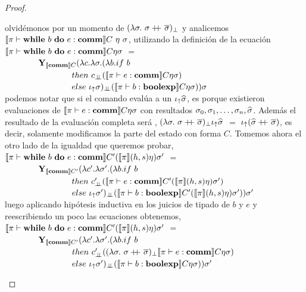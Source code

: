 \begin{proof}
\begin{itemize}
\begin{itemize}
olvid\'emonos por un momento de $(\lambda \sigma. \ \sigma +\kern-1.3ex+\kern0.8ex \overline{\sigma})_{\bot}$
y analicemos $\semBrcks{\pi \vdash \cwhiledo{b}{e} : \commt}C \ \eta \ \sigma$, utilizando
la definici\'on de la ecuaci\'on\\

$\llbracket \pi \vdash \textbf{while} \ b \ \textbf{do} \ e : \textbf{comm} \rrbracket C \eta \sigma$ $=$ \\
\indent \ \ \ \ \ \ \ \
$\textbf{Y}_{\llbracket \textbf{comm} \rrbracket C} (\lambda c . \lambda \sigma . (\lambda b . if \ b$ \\
\indent \ \ \ \ \ \ \ \ \ \ \ \ \ \ \ \
$then \ c_{\dbot}(\semBrcks{\pi \vdash e : \commt}C \eta \sigma)$ \\
\indent \ \ \ \ \ \ \ \ \ \ \ \ \ \ \ \
$else \ \iota_{\uparrow} \sigma)_{\bot \!\!\! \bot} (\llbracket \pi \vdash b : \textbf{boolexp} \rrbracket C\eta\sigma))\sigma$ \\

podemos notar que si el comando eval\'ua a un $\iota_{\uparrow}\widehat{\sigma}$, es porque 
existieron evaluaciones de $\llbracket \pi \vdash e : \textbf{comm} \rrbracket C \eta \sigma$
con resultados $\sigma_0, \sigma_1, \ldots, \sigma_n, \widehat{\sigma}$. Adem\'as 
el resultado de la evaluaci\'on completa ser\'a ,
$(\lambda \sigma. \ \sigma +\kern-1.3ex+\kern0.8ex \overline{\sigma})_{\bot} \iota_{\uparrow} \widehat{\sigma}$ $=$
$\iota_{\uparrow} (\widehat{\sigma} +\kern-1.3ex+\kern0.8ex \overline{\sigma})$, es decir, solamente modificamos la parte del estado
con forma $C$. Tomemos ahora el otro lado de la igualdad que queremos probar,\\

$\llbracket \pi \vdash \textbf{while} \ b \ \textbf{do} \ e : \textbf{comm} \rrbracket C' (\llbracket \pi \rrbracket(h,s)\eta) \sigma'$ $=$ \\
\indent \ \ \ \ \ \ \ \
$\textbf{Y}_{\llbracket \textbf{comm} \rrbracket C'} (\lambda c' . \lambda \sigma' . (\lambda b . if \ b$ \\
\indent \ \ \ \ \ \ \ \ \ \ \ \ \ \ \ \
$then \ c'_{\dbot}(\semBrcks{\pi \vdash e : \commt}C'(\semBrcks{\pi}(h,s)\eta) \sigma')$ \\
\indent \ \ \ \ \ \ \ \ \ \ \ \ \ \ \ \
$else \ \iota_{\uparrow} \sigma')_{\bot \!\!\! \bot} 
	(\llbracket \pi \vdash b : \textbf{boolexp} \rrbracket C'(\llbracket \pi \rrbracket(h,s)\eta)\sigma'))\sigma'$ \\

luego aplicando hip\'otesis inductiva en los juicios de tipado de $b$ y $e$ y reescribiendo
un poco las ecuaciones obtenemos,\\

$\llbracket \pi \vdash \textbf{while} \ b \ \textbf{do} \ e : \textbf{comm} \rrbracket C' (\llbracket \pi \rrbracket(h,s)\eta) \sigma'$ $=$ \\
\indent \ \ \ \ \ \ \ \
$\textbf{Y}_{\llbracket \textbf{comm} \rrbracket C'} (\lambda c' . \lambda \sigma' . (\lambda b . if \ b$ \\
\indent \ \ \ \ \ \ \ \ \ \ \ \ \ \ \ \
$then \ c'_{\bot \!\!\! \bot}((\lambda \sigma. \ \sigma +\kern-1.3ex+\kern0.8ex \overline{\sigma})_{\bot}
					\llbracket \pi \vdash e : \textbf{comm} \rrbracket C \eta \sigma)$ \\
\indent \ \ \ \ \ \ \ \ \ \ \ \ \ \ \ \
$else \ \iota_{\uparrow} \sigma')_{\bot \!\!\! \bot} 
	(\llbracket \pi \vdash b : \textbf{boolexp} \rrbracket C \eta \sigma))\sigma'$ \\
	

\end{itemize}
\end{itemize}
\end{proof}
